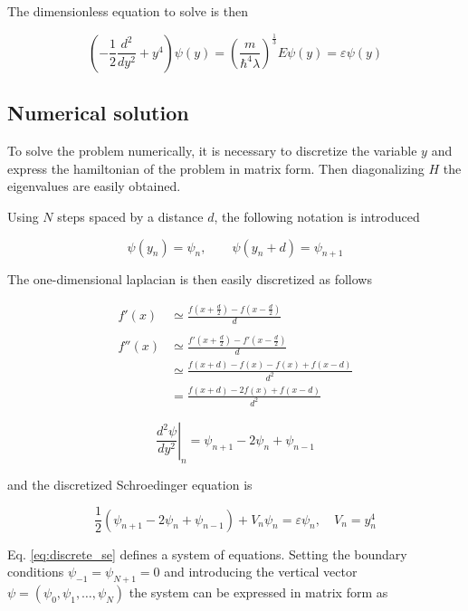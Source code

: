 \documentclass{article}
\begin{document}
The dimensionless equation to solve is then

\begin{equation}
\left( -\frac{1}{2}\frac{d^2}{dy^2} + y^4 \right) \psi(y) = \left(\frac{m}{\hbar^4 \lambda} \right)^{\frac{1}{3}} E \psi(y) = \varepsilon \psi(y)
\end{equation}

\subsection{Numerical solution}

To solve the problem numerically, it is necessary to discretize the variable \( y \) and express the hamiltonian of the problem in matrix form. Then diagonalizing \( H \) the eigenvalues are easily obtained.

Using \( N \) steps spaced by a distance \( d \), the following notation is introduced

\[ \psi(y_n) = \psi_n, \qquad \psi(y_n + d) = \psi_{n+1} \]

The one-dimensional laplacian is then easily discretized as follows

\begin{align*}
f'(x) & \simeq \frac{f\left(x+\frac{d}{2}\right) - f\left(x-\frac{d}{2}\right)}{d} \\ \\
f''(x) & \simeq \frac{f'\left(x+\frac{d}{2}\right) - f'\left(x-\frac{d}{2}\right)}{d} \\
& \simeq \frac{f\left(x+d\right) - f(x) - f(x) + f\left(x-d\right)}{d^2} \\
& = \frac{f(x+d) - 2f(x) + f(x-d)}{d^2}
\end{align*}

\begin{equation}
\left. \frac{d^2\psi}{dy^2} \right\vert_n = \psi_{n+1} - 2\psi_n + \psi_{n-1}
\end{equation}

and the discretized Schroedinger equation is

\begin{equation}
\label{eq:discrete_se}
\frac{1}{2} \left( \psi_{n+1} - 2\psi_n + \psi_{n-1} \right) + V_n \psi_n = \varepsilon \psi_n, \quad V_n = y_n^4
\end{equation}

Eq. \eqref{eq:discrete_se} defines a system of equations. Setting the boundary conditions \( \psi_{-1} = \psi_{N+1} = 0 \) and introducing the vertical vector \( \psi = (\psi_0, \psi_1, \dots, \psi_N) \) the system can be expressed in matrix form as
\end{document}
